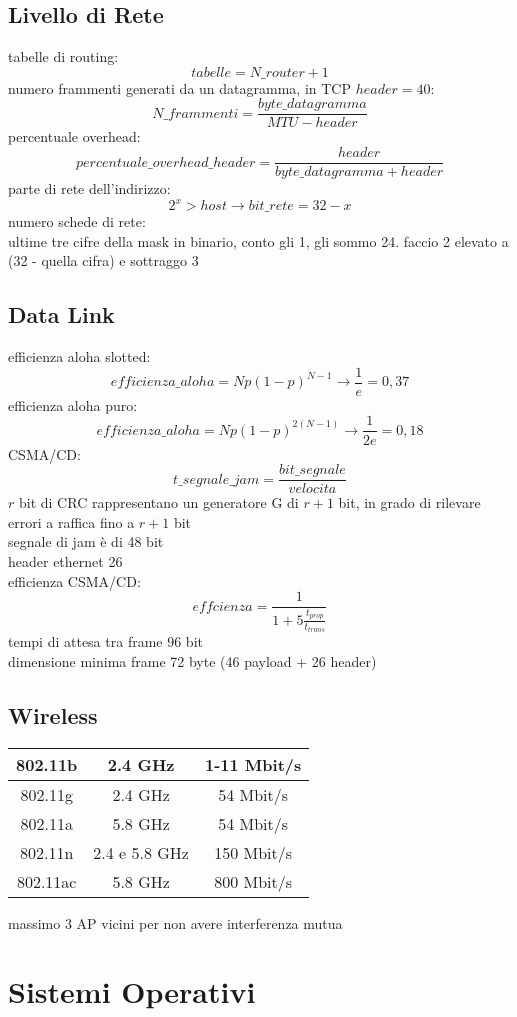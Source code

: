 \documentclass[a4paper,12pt, oneside]{book}
\begin{document}
\section{Livello di Rete}
tabelle di routing:
$$tabelle=N\_router+1$$
numero frammenti generati da un datagramma, in TCP $header=40$:
$$N\_frammenti=\frac{byte\_datagramma}{MTU-header}$$
percentuale overhead:
$$percentuale\_overhead\_header=\frac{header}{byte\_datagramma+header}$$
parte di rete dell'indirizzo:
$$2^x>host\to bit\_rete=32-x$$
numero schede di rete:
\\ ultime tre cifre della mask in binario, conto gli 1, gli sommo 24. faccio 2 elevato a (32 - quella cifra) e sottraggo 3\\
\section{Data Link}
efficienza aloha slotted:
$$efficienza\_aloha=Np(1-p)^{N-1}\to \frac{1}{e}=0,37$$
efficienza aloha puro:
$$efficienza\_aloha=Np(1-p)^{2(N-1)}\to \frac{1}{2e}=0,18$$
CSMA/CD:
$$t\_segnale\_jam=\frac{bit\_segnale}{velocita}$$
$r$ bit di CRC rappresentano un generatore G di
$r + 1$ bit, in grado di rilevare errori a raffica fino
a $r + 1$ bit\\
segnale di jam è di 48 bit\\
header ethernet 26\\
efficienza CSMA/CD:
$$effcienza= \frac{1}{1+5\frac{t_{prop}}{t_{trans}}}$$
tempi di attesa tra frame 96 bit\\
dimensione minima frame 72 byte (46 payload + 26 header)
\section{Wireless}
\begin{center}
\begin{tabular}{|c|c|c|}
\hline
802.11b & 2.4 GHz & 1-11 Mbit/s\\
\hline
802.11g & 2.4 GHz & 54 Mbit/s\\
\hline
802.11a & 5.8 GHz & 54 Mbit/s\\
\hline
802.11n & 2.4 e 5.8 GHz & 150 Mbit/s\\
\hline
802.11ac & 5.8 GHz & 800 Mbit/s\\
\hline
\end{tabular}
\end{center}
massimo 3 AP vicini per non avere interferenza mutua
\chapter{Sistemi Operativi}
\end{document}
